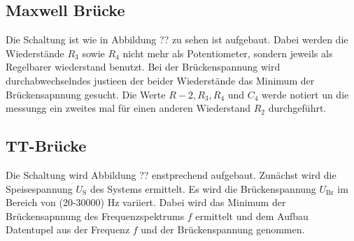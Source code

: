 \subsection{Maxwell Brücke}
Die Schaltung ist wie in Abbildung ?? zu sehen ist aufgebaut. Dabei werden die Wiederstände $R_3$ sowie $R_4$ nicht mehr als Potentiometer, sondern jeweils als Regelbarer wiederstand benutzt. Bei der Brückenspannung wird durchabwechselndes justieen der beider Wiederstände das Minimum der Brückensapnnung gesucht. Die Werte $R-2, R_3, R_4$ und $C_4$ werde notiert un die messungg ein zweites mal für einen anderen Wiederstand $R_2$ durchgeführt.
\subsection{TT-Brücke}
Die Schaltung wird Abbildung ?? enstprechend aufgebaut. Zunächst wird die Speisespannung $U_\text{S}$ des Systems ermittelt. Es wird die Brückenspannung $U_\text{Br}$ im Bereich von (20-30000) Hz variiert. Dabei wird das Minimum der Brückensapnnung des Frequenzspektrums $f$ ermittelt und dem Aufbau Datentupel aus der Frequenz $f$ und der Brückenspannung genommen.

